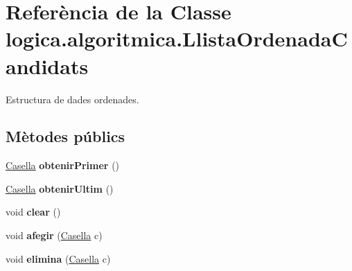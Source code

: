 \hypertarget{classlogica_1_1algoritmica_1_1_llista_ordenada_candidats}{\section{Referència de la Classe logica.\+algoritmica.\+Llista\+Ordenada\+Candidats}
\label{classlogica_1_1algoritmica_1_1_llista_ordenada_candidats}
}


Estructura de dades ordenades.  


\subsection*{Mètodes públics}
\begin{DoxyCompactItemize}
\item 
\hypertarget{classlogica_1_1algoritmica_1_1_llista_ordenada_candidats_a8d69cb86084a5fcf7fda75e85bf6221d}{\hyperlink{classlogica_1_1algoritmica_1_1_casella}{Casella} {\bfseries obtenir\+Primer} ()}\label{classlogica_1_1algoritmica_1_1_llista_ordenada_candidats_a8d69cb86084a5fcf7fda75e85bf6221d}

\item 
\hypertarget{classlogica_1_1algoritmica_1_1_llista_ordenada_candidats_ad6cdf565555d27f8e5b50ae67bc66e16}{\hyperlink{classlogica_1_1algoritmica_1_1_casella}{Casella} {\bfseries obtenir\+Ultim} ()}\label{classlogica_1_1algoritmica_1_1_llista_ordenada_candidats_ad6cdf565555d27f8e5b50ae67bc66e16}

\item 
\hypertarget{classlogica_1_1algoritmica_1_1_llista_ordenada_candidats_a0d405bdd9cb347353e4e29c35e064d5d}{void {\bfseries clear} ()}\label{classlogica_1_1algoritmica_1_1_llista_ordenada_candidats_a0d405bdd9cb347353e4e29c35e064d5d}

\item 
\hypertarget{classlogica_1_1algoritmica_1_1_llista_ordenada_candidats_a047df4631890e7efea712ab7d711b715}{void {\bfseries afegir} (\hyperlink{classlogica_1_1algoritmica_1_1_casella}{Casella} c)}\label{classlogica_1_1algoritmica_1_1_llista_ordenada_candidats_a047df4631890e7efea712ab7d711b715}

\item 
\hypertarget{classlogica_1_1algoritmica_1_1_llista_ordenada_candidats_aa3dc103893d5b778b7cc7e3d34d51553}{void {\bfseries elimina} (\hyperlink{classlogica_1_1algoritmica_1_1_casella}{Casella} c)}\label{classlogica_1_1algoritmica_1_1_llista_ordenada_candidats_aa3dc103893d5b778b7cc7e3d34d51553}


\end{DoxyCompactItemize}
